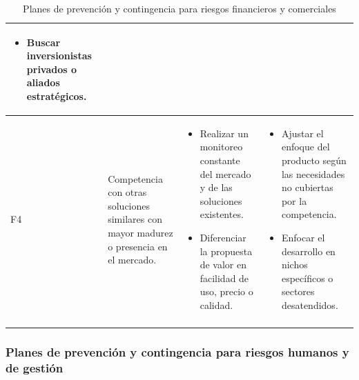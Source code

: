 \begin{longtable}{|>{\centering\arraybackslash}p{0.8cm}|>{\raggedright\arraybackslash}p{3.5cm}|>{\raggedright\arraybackslash}p{5.1cm}|>{\raggedright\arraybackslash}p{5.1cm}|}
\begin{itemize}
		\item Buscar inversionistas privados o aliados estratégicos.
	\end{itemize} \\
	\hline
	F4 & Competencia con otras soluciones similares con mayor madurez o presencia en el mercado. &
	\begin{itemize}
		\item Realizar un monitoreo constante del mercado y de las soluciones existentes.
		\item Diferenciar la propuesta de valor en facilidad de uso, precio o calidad.
	\end{itemize} &
	\begin{itemize}
		\item Ajustar el enfoque del producto según las necesidades no cubiertas por la competencia.
		\item Enfocar el desarrollo en nichos específicos o sectores desatendidos.
	\end{itemize} \\
	\hline
	\caption{Planes de prevención y contingencia para riesgos financieros y comerciales}
	 \label{tab:riesgos_financieros}
\end{longtable}

\newpage

\subsubsection{Planes de prevención y contingencia para riesgos humanos y de gestión}

\setlength{\tabcolsep}{4pt}
\renewcommand{\arraystretch}{1.2}

